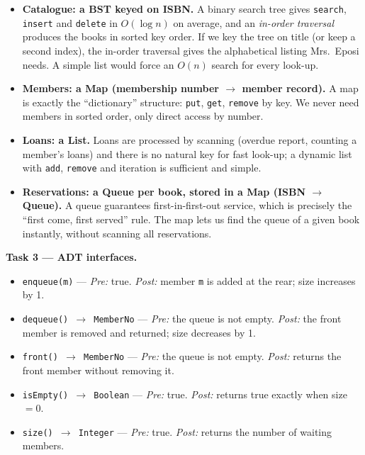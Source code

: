 \documentclass[11pt]{article}
\begin{document}
\begin{itemize}
\item \textbf{Catalogue: a BST keyed on ISBN.} A binary search tree gives \texttt{search}, \texttt{insert} and \texttt{delete} in $O(\log n)$ on average, and an \emph{in-order traversal} produces the books in sorted key order. If we key the tree on title (or keep a second index), the in-order traversal gives the alphabetical listing Mrs.\ Eposi needs. A simple list would force an $O(n)$ search for every look-up.
\item \textbf{Members: a Map (membership number $\rightarrow$ member record).} A map is exactly the ``dictionary'' structure: \texttt{put}, \texttt{get}, \texttt{remove} by key. We never need members in sorted order, only direct access by number.
\item \textbf{Loans: a List.} Loans are processed by scanning (overdue report, counting a member's loans) and there is no natural key for fast look-up; a dynamic list with \texttt{add}, \texttt{remove} and iteration is sufficient and simple.
\item \textbf{Reservations: a Queue per book, stored in a Map (ISBN $\rightarrow$ Queue).} A queue guarantees first-in-first-out service, which is precisely the ``first come, first served'' rule. The map lets us find the queue of a given book instantly, without scanning all reservations.
\end{itemize}

\textbf{Task 3 — ADT interfaces.}

\begin{exemplebox}
\begin{itemize}
\item \texttt{enqueue(m)} — \emph{Pre:} true. \emph{Post:} member \texttt{m} is added at the rear; size increases by 1.
\item \texttt{dequeue() $\rightarrow$ MemberNo} — \emph{Pre:} the queue is not empty. \emph{Post:} the front member is removed and returned; size decreases by 1.
\item \texttt{front() $\rightarrow$ MemberNo} — \emph{Pre:} the queue is not empty. \emph{Post:} returns the front member without removing it.
\item \texttt{isEmpty() $\rightarrow$ Boolean} — \emph{Pre:} true. \emph{Post:} returns true exactly when size $= 0$.
\item \texttt{size() $\rightarrow$ Integer} — \emph{Pre:} true. \emph{Post:} returns the number of waiting members.
\end{itemize}
\end{exemplebox}
\end{document}

